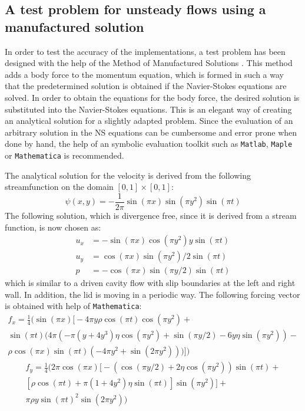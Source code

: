 \subsection{A test problem for unsteady flows using a manufactured solution}
\label{sec:testproblemNS}

In order to test the accuracy of the implementations, a test problem has been designed with the help of the
Method of Manufactured Solutions \cite{Steinberg85}.
This method adds a body force to the momentum equation, which is formed in such a way that the predetermined solution
is obtained if the Navier-Stokes equations are solved.
In order to obtain the equations for the body force, the desired solution is substituted into the Navier-Stokes equations.
This is an elegant way of creating an analytical solution for a slightly adapted problem.
Since the evaluation of an arbitrary solution in the NS equations can be cumbersome and error prone when done by hand,
the help of an symbolic evaluation toolkit such as \texttt{Matlab}, \texttt{Maple} or \texttt{Mathematica} is recommended.
 
The analytical solution for the velocity is derived from the following streamfunction on the domain $[0,1]\times[0,1]$:
\[
  \psi(x,y) = -\frac1{2\pi} \sin(\pi x) \sin( \pi y^{2}) \sin(\pi t)
\]
The following solution, which is divergence free, since it is derived from a stream function, is now chosen as:
\begin{align}
u_{x} &= -\sin(\pi x)\cos( \pi y^{2}) y \sin(\pi t)  \\
u_{y} &=\cos(\pi x) \sin( \pi y^{2} )/2\sin(\pi t)\\
p &= -\cos(\pi x)\sin( \pi y/2) \sin(\pi t) 
\end{align}
which is similar to a driven cavity flow with slip boundaries at the left and right wall.
In addition, the lid is moving in a periodic way.
The following forcing vector is obtained with help of \texttt{Mathematica}:
\begin{multline*}
f_{x} =\frac{1}{4} \biggl(\sin(\pi x) \biggl[ -4 \pi y \rho \cos(\pi t) \cos(\pi y^{2}) + \\
\sin( \pi t) \bigl( 4 \pi ( -\pi (y+4y^{3}) \eta \cos(\pi y^{2}) + \sin( \pi y / 2) - 6 y \eta \sin( \pi y^{2}) ) - \\
\rho \cos( \pi x ) \sin( \pi t) (-4 \pi y^{2} + \sin( 2 \pi y^{2} )) \bigr) \biggr] \biggr)
\end{multline*}\vspace*{-4ex}
\begin{multline*}
f_{y} = \frac{1}{4} \biggl( 2 \pi \cos ( \pi x) \biggl[ - ( \cos( \pi y/2) + 2
\eta \cos( \pi y^{2}) ) \sin( \pi t) + \\
[ \rho \cos( \pi t) + \pi ( 1 + 4 y^{2} ) \eta \sin(\pi t ) ] \sin(\pi y^{2}) \biggr] + \\
\pi \rho y \sin( \pi t)^{2} \sin( 2 \pi y^{2}) \biggr)
\end{multline*}

